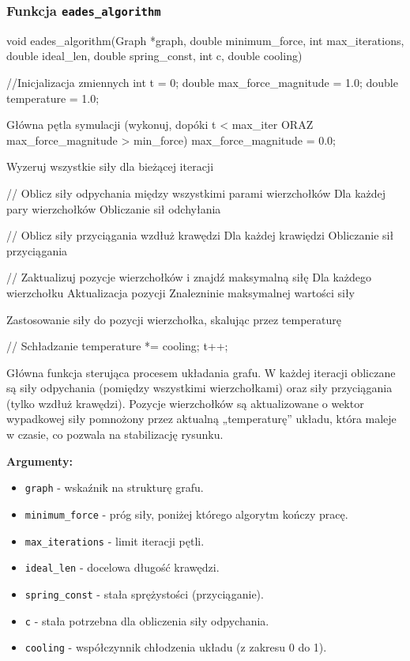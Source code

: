 \documentclass[]{article}
\begin{document}
\subsubsection{Funkcja \texttt{eades\_algorithm}}
\begin{mylisting}
void eades_algorithm(Graph *graph, 
    double minimum_force, int max_iterations, 
    double ideal_len, double spring_const, int c, double cooling)
{
    //Inicjalizacja zmiennych
    int t = 0;
    double max_force_magnitude = 1.0;
    double temperature = 1.0;

    Główna pętla symulacji (wykonuj, dopóki t < max_iter ORAZ max_force_magnitude > min_force)
        max_force_magnitude = 0.0;

        Wyzeruj wszystkie siły dla bieżącej iteracji
        

        // Oblicz siły odpychania między wszystkimi parami wierzchołków
        Dla każdej pary wierzchołków
                Obliczanie sił odchyłania
            
        

        // Oblicz siły przyciągania wzdłuż krawędzi
        Dla każdej krawiędzi
            Obliczanie sił przyciągania

        // Zaktualizuj pozycje wierzchołków i znajdź maksymalną siłę
        Dla każdego wierzchołku
            Aktualizacja pozycji
            Znalezninie maksymalnej wartości siły

            Zastosowanie siły do pozycji wierzchołka, skalując przez temperaturę
            
        }

        // Schładzanie
        temperature *= cooling;
        t++;

\end{mylisting}

Główna funkcja sterująca procesem układania grafu. W każdej iteracji obliczane są siły odpychania (pomiędzy wszystkimi wierzchołkami) oraz siły przyciągania (tylko wzdłuż krawędzi). Pozycje wierzchołków są aktualizowane o wektor wypadkowej siły pomnożony przez aktualną „temperaturę” układu, która maleje w czasie, co pozwala na stabilizację rysunku.

\textbf{Argumenty:}
\begin{itemize}
    \item \texttt{graph} - wskaźnik na strukturę grafu.
    \item \texttt{minimum\_force} - próg siły, poniżej którego algorytm kończy pracę.
    \item \texttt{max\_iterations} - limit iteracji pętli.
    \item \texttt{ideal\_len} - docelowa długość krawędzi.
    \item \texttt{spring\_const} - stała sprężystości (przyciąganie).
    \item \texttt{c} - stała potrzebna dla obliczenia siły odpychania.
    \item \texttt{cooling} - współczynnik chłodzenia układu (z zakresu 0 do 1).
\end{itemize}
\end{document}
